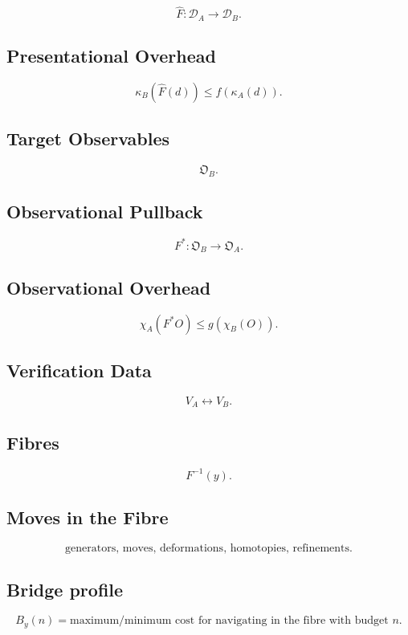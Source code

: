 \documentclass[11pt]{article}
\begin{document}
\[
\widehat F:\mathcal D_A\to\mathcal D_B.
\]

\subsection*{Presentational Overhead}

\[
\kappa_B(\widehat F(d))
\le
f(\kappa_A(d)).
\]

\subsection*{Target Observables}

\[
\mathfrak O_B.
\]

\subsection*{Observational Pullback}

\[
F^\ast:\mathfrak O_B\to\mathfrak O_A.
\]

\subsection*{Observational Overhead}

\[
\chi_A(F^\ast O)
\le
g(\chi_B(O)).
\]

\subsection*{Verification Data}

\[
V_A\leftrightarrow V_B.
\]

\subsection*{Fibres}

\[
F^{-1}(y).
\]

\subsection*{Moves in the Fibre}

\[
\text{generators, moves, deformations, homotopies, refinements}.
\]

\subsection*{Bridge profile}

\[
B_y(n)=\text{maximum/minimum cost for navigating in the fibre with budget }n.
\]
\end{document}
